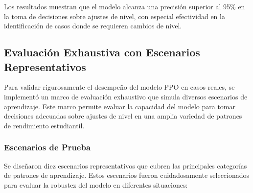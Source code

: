 Los resultados muestran que el modelo alcanza una precisión superior al 95\% en la toma de decisiones sobre ajustes de nivel, con especial efectividad en la identificación de casos donde se requieren cambios de nivel.

\subsection{Evaluación Exhaustiva con Escenarios Representativos}
\label{evaluacion-exhaustiva-ppo}

Para validar rigurosamente el desempeño del modelo PPO en casos reales, se implementó un marco de evaluación exhaustivo que simula diversos escenarios de aprendizaje. Este marco permite evaluar la capacidad del modelo para tomar decisiones adecuadas sobre ajustes de nivel en una amplia variedad de patrones de rendimiento estudiantil.

\subsubsection{Escenarios de Prueba}

Se diseñaron diez escenarios representativos que cubren las principales categorías de patrones de aprendizaje. Estos escenarios fueron cuidadosamente seleccionados para evaluar la robustez del modelo en diferentes situaciones:

